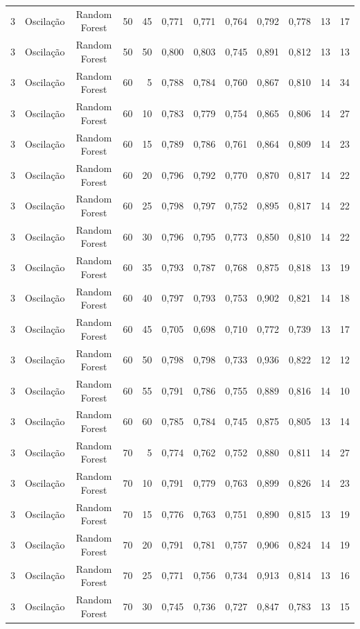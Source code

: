 \begin{longtable}{ccclrrrrrrrr}
3 & Oscilação & Random Forest & 50 & 45 & 0,771 & 0,771 & 0,764 & 0,792 & 0,778 & 13 & 17 \\
3 & Oscilação & Random Forest & 50 & 50 & 0,800 & 0,803 & 0,745 & 0,891 & 0,812 & 13 & 13 \\
3 & Oscilação & Random Forest & 60 & 5 & 0,788 & 0,784 & 0,760 & 0,867 & 0,810 & 14 & 34 \\
3 & Oscilação & Random Forest & 60 & 10 & 0,783 & 0,779 & 0,754 & 0,865 & 0,806 & 14 & 27 \\
3 & Oscilação & Random Forest & 60 & 15 & 0,789 & 0,786 & 0,761 & 0,864 & 0,809 & 14 & 23 \\
3 & Oscilação & Random Forest & 60 & 20 & 0,796 & 0,792 & 0,770 & 0,870 & 0,817 & 14 & 22 \\
3 & Oscilação & Random Forest & 60 & 25 & 0,798 & 0,797 & 0,752 & 0,895 & 0,817 & 14 & 22 \\
3 & Oscilação & Random Forest & 60 & 30 & 0,796 & 0,795 & 0,773 & 0,850 & 0,810 & 14 & 22 \\
3 & Oscilação & Random Forest & 60 & 35 & 0,793 & 0,787 & 0,768 & 0,875 & 0,818 & 13 & 19 \\
3 & Oscilação & Random Forest & 60 & 40 & 0,797 & 0,793 & 0,753 & 0,902 & 0,821 & 14 & 18 \\
3 & Oscilação & Random Forest & 60 & 45 & 0,705 & 0,698 & 0,710 & 0,772 & 0,739 & 13 & 17 \\
3 & Oscilação & Random Forest & 60 & 50 & 0,798 & 0,798 & 0,733 & 0,936 & 0,822 & 12 & 12 \\
3 & Oscilação & Random Forest & 60 & 55 & 0,791 & 0,786 & 0,755 & 0,889 & 0,816 & 14 & 10 \\
3 & Oscilação & Random Forest & 60 & 60 & 0,785 & 0,784 & 0,745 & 0,875 & 0,805 & 13 & 14 \\
3 & Oscilação & Random Forest & 70 & 5 & 0,774 & 0,762 & 0,752 & 0,880 & 0,811 & 14 & 27 \\
3 & Oscilação & Random Forest & 70 & 10 & 0,791 & 0,779 & 0,763 & 0,899 & 0,826 & 14 & 23 \\
3 & Oscilação & Random Forest & 70 & 15 & 0,776 & 0,763 & 0,751 & 0,890 & 0,815 & 13 & 19 \\
3 & Oscilação & Random Forest & 70 & 20 & 0,791 & 0,781 & 0,757 & 0,906 & 0,824 & 14 & 19 \\
3 & Oscilação & Random Forest & 70 & 25 & 0,771 & 0,756 & 0,734 & 0,913 & 0,814 & 13 & 16 \\
3 & Oscilação & Random Forest & 70 & 30 & 0,745 & 0,736 & 0,727 & 0,847 & 0,783 & 13 & 15 \\

\end{longtable}
